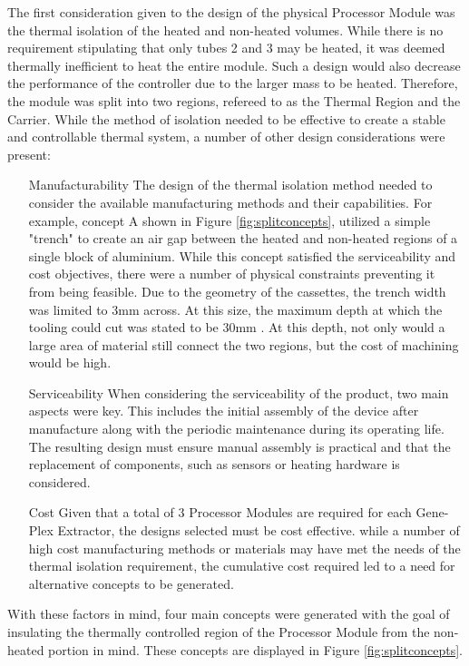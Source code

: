 The first consideration given to the design of the physical Processor Module was the thermal isolation of the heated and non-heated volumes. While there is no requirement stipulating that only tubes 2 and 3 may be heated, it was deemed  thermally inefficient to heat the entire module. Such a design would also decrease the performance of the controller due to the larger mass to be heated. Therefore, the module was split into two regions, refereed to as the Thermal Region and the Carrier. While the method of isolation needed to be effective to create a stable and controllable thermal system, a number of other design considerations were present:
\begin{enumerate}
	\item[Manufacturability] The design of the thermal isolation method needed to consider the available manufacturing methods and their capabilities. For example, concept A shown in Figure \ref{fig:splitconcepts}, utilized a simple "trench" to create an air gap between the heated and non-heated regions of a single block of aluminium. While this concept satisfied the serviceability and cost objectives, there were a number of physical constraints preventing it from being feasible. Due to the geometry of the cassettes, the trench width was limited to 3mm across. At this size, the maximum depth at which the tooling could cut was stated to be 30mm \cite{Sorenson}. At this depth, not only would a large area of material still connect the two regions, but the cost of machining would be high.
	\item[Serviceability] When considering the serviceability of the product, two main aspects were key. This includes the initial assembly of the device after manufacture along with the periodic maintenance during its operating life. The resulting design must ensure manual assembly is practical and that the replacement of components, such as sensors or heating hardware is considered. 
	\item[Cost] Given that a total of 3 Processor Modules are required for each Gene-Plex Extractor, the designs selected must be cost effective. while a number of high cost manufacturing methods or materials may have met the needs of the thermal isolation requirement, the cumulative cost required led to a need for alternative concepts to be generated.
\end{enumerate}	

With these factors in mind, four main concepts were generated with the goal of insulating the thermally controlled region of the Processor Module from the non-heated portion in mind. These concepts are displayed in Figure \ref{fig:splitconcepts}.\\


